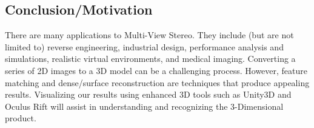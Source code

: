 \documentclass[10pt,twocolumn,letterpaper]{article}
\begin{document}
\subsection{Conclusion/Motivation}
There are many applications to Multi-View Stereo.  They include (but are not limited to) reverse engineering, industrial design, performance analysis and simulations, realistic virtual environments, and medical imaging.  Converting a series of 2D images to a 3D model can be a challenging process.  However, feature matching and dense/surface reconstruction are techniques that produce appealing results.  Visualizing our results using enhanced 3D tools such as Unity3D and Oculus Rift will assist in understanding and recognizing the 3-Dimensional product.











{\small


}
\end{document}
